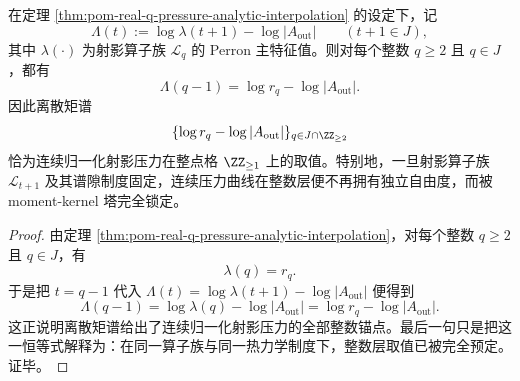 \begin{theorem}[离散矩谱的整点嵌入唯一锚定连续射影压力]\label{thm:xi-projective-moment-tower-anchors-normalized-pressure}
在定理 \ref{thm:pom-real-q-pressure-analytic-interpolation} 的设定下，记
\[
\Lambda(t):=\log \lambda(t+1)-\log |A_{\mathrm{out}}|
\qquad (t+1\in J),
\]
其中 \(\lambda(\cdot)\) 为射影算子族 \(\mathcal L_q\) 的 Perron 主特征值。则对每个整数
\(q\ge 2\) 且 \(q\in J\)，都有
\[
\Lambda(q-1)=\log r_q-\log |A_{\mathrm{out}}|.
\]
因此离散矩谱
\[
\{\log r_q-\log |A_{\mathrm{out}}|\}_{q\in J\cap \ZZ_{\ge 2}}
\]
恰为连续归一化射影压力在整点格 \(\ZZ_{\ge 1}\) 上的取值。特别地，一旦射影算子族
\(\mathcal L_{t+1}\)
及其谱隙制度固定，连续压力曲线在整数层便不再拥有独立自由度，而被 moment-kernel 塔完全锁定。
\end{theorem}
\begin{proof}
由定理 \ref{thm:pom-real-q-pressure-analytic-interpolation}，对每个整数
\(q\ge 2\) 且 \(q\in J\)，有
\[
\lambda(q)=r_q.
\]
于是把 \(t=q-1\) 代入
\(
\Lambda(t)=\log \lambda(t+1)-\log |A_{\mathrm{out}}|
\)
便得到
\[
\Lambda(q-1)=\log \lambda(q)-\log |A_{\mathrm{out}}|
=
\log r_q-\log |A_{\mathrm{out}}|.
\]
这正说明离散矩谱给出了连续归一化射影压力的全部整数锚点。最后一句只是把这一恒等式解释为：在同一算子族与同一热力学制度下，整数层取值已被完全预定。证毕。
\end{proof}
